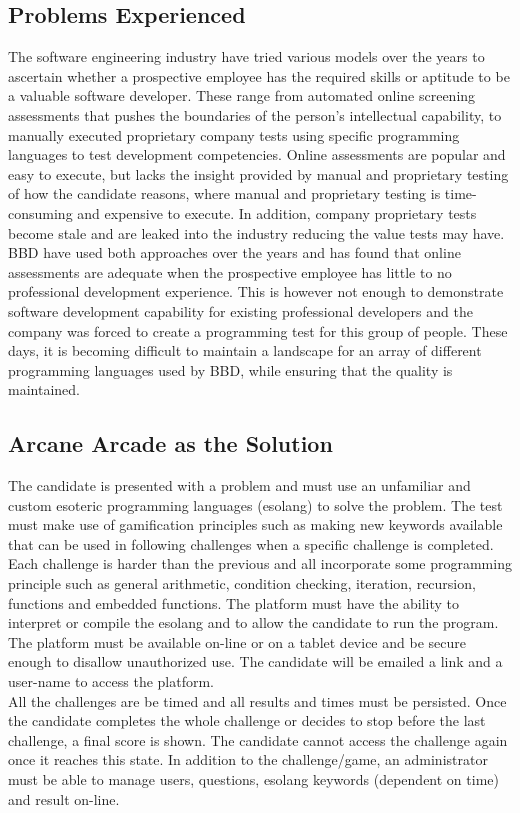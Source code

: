 \documentclass[english]{article}
\begin{document}
		\subsection{Problems Experienced}
		The software engineering industry have tried various models over the years to ascertain whether a prospective employee has the required skills or aptitude to be a valuable software developer. These range from automated online screening assessments that pushes the boundaries of the person's intellectual capability, to manually executed proprietary company tests using specific programming languages to test development competencies. Online assessments are popular and easy to execute, but lacks the insight provided by manual and proprietary testing of how the candidate reasons, where manual and proprietary testing is time-consuming and expensive to execute. In addition, company proprietary tests become stale and are leaked into the industry reducing the value tests may have.
		\\[12pt]
		BBD have used both approaches over the years and has found that online assessments are adequate when the prospective employee has little to no professional development experience. This is however not enough to demonstrate software development capability for existing professional developers and the company was forced to create a programming test for this group of people. These days, it is becoming difficult to maintain a landscape for an array of different programming languages used by BBD, while ensuring that the quality is maintained.

		\newpage
		\subsection{Arcane Arcade as the Solution}
		The candidate is presented with a problem and must use an unfamiliar and custom esoteric programming languages (esolang) to solve the problem. The test must make use of gamification principles such as making new keywords available that can be used in following challenges when a specific challenge is completed. 
		\\[12pt]
		Each challenge is harder than the previous and all incorporate some programming principle such as general arithmetic, condition checking, iteration, recursion, functions and embedded functions. The platform must have the ability to interpret or compile the esolang and to allow the candidate to run the program. The platform must be available on-line or on a tablet device and be secure enough to disallow unauthorized use. The candidate will be emailed a link and a user-name to access the platform. 
		\\[12pt]
		All the challenges are be timed and all results and times must be persisted. Once the candidate completes the whole challenge or decides to stop before the last challenge, a final score is shown. The candidate cannot access the challenge again once it reaches this state. In addition to the challenge/game, an administrator must be able to manage users, questions, esolang keywords (dependent on time) and result on-line.
		
\end{document}
